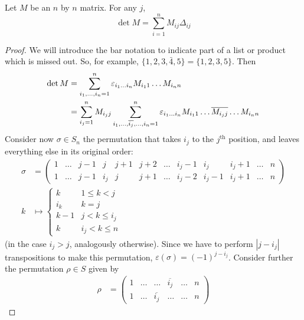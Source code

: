 \documentclass{../../template/note}
\begin{document}
    \begin{theorem}
        Let \(M\) be an \(n\) by \(n\) matrix. For any \(j\),
        \[
            \det M = \sum_{i=1}^n M_{ij} \Delta_{ij}
        \]
    \end{theorem}
    
    \begin{proof}
        We will introduce the bar notation to indicate part of a list or product which is missed out. So, for example, \(\{1, 2, 3, \bar 4, 5\} = \{1, 2, 3, 5\}\). Then
        \begin{align*}
            \det M &= \sum_{i_1, \dots, i_n = 1}^n \varepsilon_{i_1 \dots i_n}M_{i_11}\dots M_{i_nn} \\
            &= \sum_{i_j=1}^n M_{i_jj} \sum_{i_1, \dots, \overline{i_j}, \dots, i_n=1}^n \varepsilon_{i_1 \dots i_n} M_{i_11} \dots \overline{M_{i_jj}} \dots M_{i_nn}
        \end{align*}
        Consider now \(\sigma \in S_n\) the permutation that takes \(i_j\) to the \(j^\text{th}\) position, and leaves everything else in its original order:
        \begin{align*}
            \sigma &= \begin{pmatrix}
             1 & \dots & j-1 & j & j+1 & j+2 & \dots & i_j-1 & i_j & i_j+1 & \dots & n \\
             1 & \dots & j-1 & i_j & j & j+1 & \dots & i_j-2 & i_j-1 & i_j+1 & \dots & n
            \end{pmatrix} \\
            k &\mapsto \begin{cases}
                k & 1 \leq k < j \\
                i_k & k = j \\
                k-1 & j < k \leq i_j \\
                k & i_j < k \leq n
            \end{cases}
        \end{align*}
        (in the case \(i_j > j\), analogously otherwise). Since we have to perform \(|j - i_j|\) transpositions to make this permutation, \(\varepsilon(\sigma) = (-1)^{j - i_j}\). Consider further the permutation \(\rho \in S\) given by
        \begin{align*}
            \rho &= \begin{pmatrix}
             1 & \dots & \dots & \overline{i_j} & \dots & n \\
             1 & \dots & \overline{i_j} & \dots & \dots & n 

\end{pmatrix}
\end{align*}
\end{proof}
\end{document}
